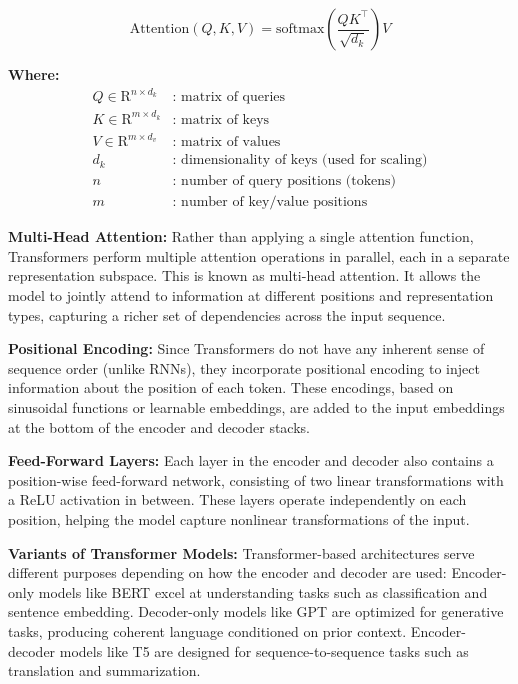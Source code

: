 \documentclass[12pt,twoside]{report}
\begin{document}
\[
\mathrm{Attention}(Q, K, V) = \mathrm{softmax}\left( \frac{QK^\top}{\sqrt{d_k}} \right)V
\]

\textbf{Where:}
\[
\begin{array}{rl}
Q \in \mathrm{R}^{n \times d_k} & \text{: matrix of queries} \\
K \in \mathrm{R}^{m \times d_k} & \text{: matrix of keys} \\
V \in \mathrm{R}^{m \times d_v} & \text{: matrix of values} \\
d_k & \text{: dimensionality of keys (used for scaling)} \\
n & \text{: number of query positions (tokens)} \\
m & \text{: number of key/value positions}
\end{array}
\]


\textbf{Multi-Head Attention:}
Rather than applying a single attention function, Transformers perform multiple attention operations in parallel, each in a separate representation subspace. This is known as multi-head attention. It allows the model to jointly attend to information at different positions and representation types, capturing a richer set of dependencies across the input sequence.

\textbf{Positional Encoding:}
Since Transformers do not have any inherent sense of sequence order (unlike RNNs), they incorporate positional encoding to inject information about the position of each token. These encodings, based on sinusoidal functions or learnable embeddings, are added to the input embeddings at the bottom of the encoder and decoder stacks.

\textbf{Feed-Forward Layers:}
Each layer in the encoder and decoder also contains a position-wise feed-forward network, consisting of two linear transformations with a ReLU activation in between. These layers operate independently on each position, helping the model capture nonlinear transformations of the input.

\textbf{Variants of Transformer Models:}
Transformer-based architectures serve different purposes depending on how the encoder and decoder are used:
Encoder-only models like BERT\cite{BERT} excel at understanding tasks such as classification and sentence embedding.
Decoder-only models like GPT\cite{GPT} are optimized for generative tasks, producing coherent language conditioned on prior context.
Encoder-decoder models like T5\cite{T5} are designed for sequence-to-sequence tasks such as translation and summarization.
\end{document}
